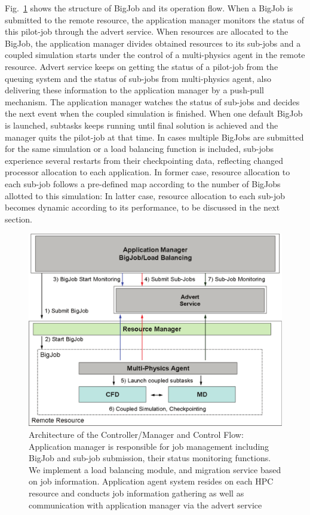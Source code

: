 \documentclass[conference,final]{IEEEtran}
\begin{document}
Fig.~\ref{Fig:BigJob_Structure} shows the structure of BigJob and its operation flow. When a BigJob is submitted to the remote resource, the application manager monitors the status of this pilot-job through the advert service. When resources are allocated to the BigJob, the application manager divides obtained resources to its sub-jobs and a coupled simulation starts under the control of a multi-physics agent in the remote resource. Advert service keeps on getting the status of a pilot-job from the queuing system and the status of sub-jobs from multi-physics agent, also delivering these information to the application manager by a push-pull mechanism. The application manager watches the status of sub-jobs and decides the next event when the coupled simulation is finished. When one default BigJob is launched, subtasks keeps running until final solution is achieved and the manager quits the pilot-job at that time. In cases multiple BigJobs are submitted for the same simulation or a load balancing function is included, sub-jobs experience several restarts from their checkpointing data, reflecting changed processor allocation to each application. In former case, resource allocation to each sub-job follows a pre-defined map according to the number of BigJobs allotted to this simulation: In latter case, resource allocation to each sub-job becomes dynamic according to its performance, to be discussed in the next section.

\begin{figure}
\centering
\includegraphics[scale=0.38]{Structure_of_BigJob}
\caption{\small Architecture of the Controller/Manager and Control Flow: Application manager is responsible for job management including BigJob and sub-job submission, their status monitoring functions. We implement a load balancing module, and migration service based on job information. Application agent system resides on each HPC resource and conducts job information gathering as well as communication with application manager via the advert service}
\label{Fig:BigJob_Structure}
\end{figure}
\end{document}
